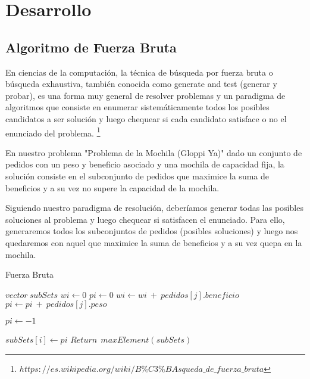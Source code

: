 \section{Desarrollo}
\label{sec:desarrollo}

\subsection{Algoritmo de Fuerza Bruta}

En ciencias de la computación, la técnica de búsqueda por fuerza bruta o búsqueda exhaustiva, también conocida como generate and test (generar y probar), es una forma muy general de resolver problemas y un paradigma de algoritmos que consiste en enumerar sistemáticamente todos los posibles candidatos a ser solución y luego chequear si cada candidato satisface o no el enunciado del problema. \footnote{$https://es.wikipedia.org/wiki/B\%C3\%BAsqueda\_de\_fuerza\_bruta$}

En nuestro problema "Problema de la Mochila (Gloppi Ya)"  dado un conjunto de pedidos con un peso y beneficio asociado y una mochila de capacidad fija, la solución consiste en el subconjunto de pedidos que maximice la suma de beneficios y a su vez no supere la capacidad de la mochila.

Siguiendo nuestro paradigma de resolución, deberíamos generar todas las posibles soluciones al problema y luego chequear si satisfacen el enunciado. Para ello, generaremos todos los subconjuntos de pedidos (posibles soluciones) y luego nos quedaremos con aquel que maximice la suma de beneficios y a su vez quepa en la mochila.


\begin{algorithm}
\caption{Fuerza Bruta}\label{selection}
\begin{algorithmic}[1]
	\State $vector \ subSets$
   	\State $wi \gets 0$
	\State $pi \gets 0$
    	\State $wi \gets wi\ +\ pedidos[j].beneficio$
	\State $pi \gets pi\ +\ pedidos[j].peso$
	\EndIf
	\EndFor

	\State $pi \gets -1$
	\EndIf

	\State $subSets[i] \gets pi $
    \EndFor
   	\State $Return \ \ maxElement(subSets)$
\EndProcedure
\end{algorithmic}
\end{algorithm}


